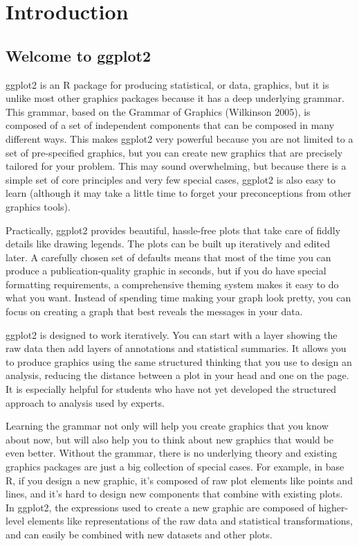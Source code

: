 \chapter{Introduction}\label{cha:introduction}

\section{Welcome to ggplot2}

ggplot2 is an R package for producing statistical, or data, graphics,
but it is unlike most other graphics packages because it has a deep
underlying grammar. This grammar, based on the Grammar of Graphics
(Wilkinson 2005), is composed of a set of independent components that
can be composed in many different ways. This makes ggplot2 very powerful
because you are not limited to a set of pre-specified graphics, but you
can create new graphics that are precisely tailored for your problem.
This may sound overwhelming, but because there is a simple set of core
principles and very few special cases, ggplot2 is also easy to learn
(although it may take a little time to forget your preconceptions from
other graphics tools).

Practically, ggplot2 provides beautiful, hassle-free plots that take
care of fiddly details like drawing legends. The plots can be built up
iteratively and edited later. A carefully chosen set of defaults means
that most of the time you can produce a publication-quality graphic in
seconds, but if you do have special formatting requirements, a
comprehensive theming system makes it easy to do what you want. Instead
of spending time making your graph look pretty, you can focus on
creating a graph that best reveals the messages in your data.

ggplot2 is designed to work iteratively. You can start with a layer
showing the raw data then add layers of annotations and statistical
summaries. It allows you to produce graphics using the same structured
thinking that you use to design an analysis, reducing the distance
between a plot in your head and one on the page. It is especially
helpful for students who have not yet developed the structured approach
to analysis used by experts.

Learning the grammar not only will help you create graphics that you
know about now, but will also help you to think about new graphics that
would be even better. Without the grammar, there is no underlying theory
and existing graphics packages are just a big collection of special
cases. For example, in base R, if you design a new graphic, it's
composed of raw plot elements like points and lines, and it's hard to
design new components that combine with existing plots. In ggplot2, the
expressions used to create a new graphic are composed of higher-level
elements like representations of the raw data and statistical
transformations, and can easily be combined with new datasets and other
plots.


